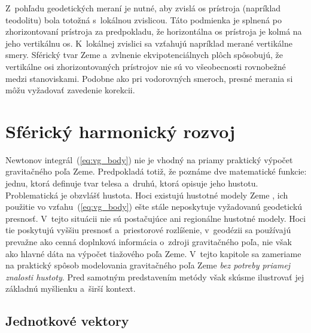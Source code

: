 \documentclass[a4paper, 12pt]{book}
\begin{document}
Z~pohľadu geodetických meraní je nutné, aby zvislá os prístroja (napríklad 
teodolitu) bola totožná s~lokálnou zvislicou.  Táto podmienka je splnená po 
zhorizontovaní prístroja za predpokladu, že horizontálna os prístroja je kolmá 
na jeho vertikálnu os.  K~lokálnej zvislici sa vzťahujú napríklad merané 
vertikálne smery.  Sférický tvar Zeme a~zvlnenie ekvipotenciálnych plôch 
spôsobujú, že vertikálne osi zhorizontovaných prístrojov nie sú vo všeobecnosti 
rovnobežné medzi stanoviskami.  Podobne ako pri vodorovných smeroch, presné 
merania si môžu vyžadovať zavedenie korekcii.







\chapter{Sférický harmonický rozvoj}
\label{sec:spherical_harmonic_expansion}

Newtonov integrál~(\ref{eq:vg_body}) nie je vhodný na priamy praktický výpočet 
gravitačného poľa Zeme.  Predpokladá totiž, že poznáme dve matematické funkcie: 
jednu, ktorá definuje tvar telesa a~druhú, ktorá opisuje jeho hustotu.  
Problematická je obzvlášť hustota.  Hoci existujú hustotné modely Zeme 
\citep[napríklad][]{Dziewonski1981}, ich použitie vo vzťahu~(\ref{eq:vg_body}) 
ešte stále neposkytuje vyžadovanú geodetickú presnosť.  V~tejto situácii nie sú 
postačujúce ani regionálne hustotné modely.  Hoci tie poskytujú vyššiu presnosť 
a~priestorové rozlíšenie, v~geodézii sa používajú prevažne ako cenná doplnková 
informácia o~zdroji gravitačného poľa, nie však ako hlavné dáta na výpočet 
tiažového poľa Zeme.  V~tejto kapitole sa zameriame na praktický spôsob 
modelovania gravitačného poľa Zeme \emph{bez potreby priamej znalosti hustoty}.  
Pred samotným predstavením metódy však skúsme ilustrovať jej základnú myšlienku 
a~širší kontext.






\section{Jednotkové vektory}
\label{sec:unit_vectors}
\end{document}
